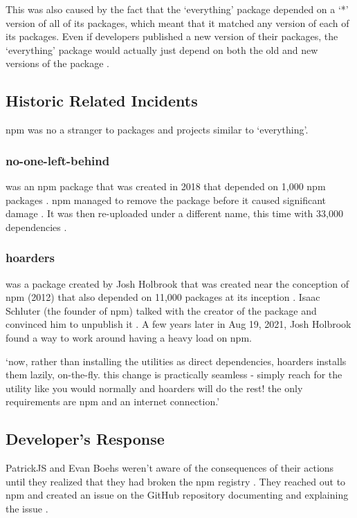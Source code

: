 \documentclass[acmsmall]{acmart}
\begin{document}
This was also caused by the fact that the `everything' package depended on a `*'
version of all of its packages, which meant that it matched any version of each
of its packages. Even if developers published a new version of their packages,
the `everything' package would actually just depend on both the old and new
versions of the package \cite{uncenter-blog-everything}.

\subsection{Historic Related Incidents}
npm was no a stranger to packages and projects similar to `everything'.

\subsubsection{no-one-left-behind}
was an npm package that was created in 2018 that depended on 1,000 npm packages
\cite{npm-no-one-left-behind-dependencies}. npm managed to remove the package
before it caused significant damage \cite{npm-no-one-left-behind-security}. It
was then re-uploaded under a different name, this time with 33,000 dependencies
\cite{socket-everything}.

\subsubsection{hoarders}
was a package created by Josh Holbrook that was created near the conception of
npm (2012) that also depended on 11,000 packages at its inception
\cite{github-hoarders-dependencies}. Isaac Schluter (the founder of npm) talked
with the creator of the package and convinced him to unpublish it
\cite{github-hoarders}.  A few years later in Aug 19, 2021, Josh Holbrook found
a way to work around having a heavy load on npm.

`now, rather than installing the utilities as direct dependencies, hoarders
installs them lazily, on-the-fly. this change is practically seamless - simply
reach for the utility like you would normally and hoarders will do the rest! the
only requirements are npm and an internet connection.' \cite{github-hoarders}

\subsection{Developer's Response}
PatrickJS and Evan Boehs weren't aware of the consequences of their actions
until they realized that they had broken the npm registry
\cite{youtube-everything}. They reached out to npm and created an issue on the
GitHub repository documenting and explaining the issue
\cite{bleepingcomputer-everything}.
\end{document}
